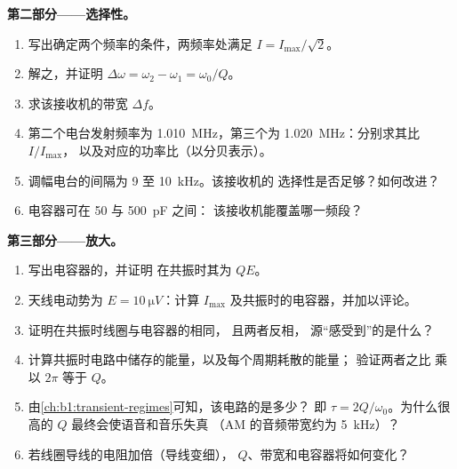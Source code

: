 \begin{problem}
\medskip
\noindent\textbf{第二部分——选择性。}
\begin{enumerate}[resume]
  \item 写出确定两个频率的条件，两频率处满足
        $I = I_{\max}/\sqrt2$。
  \item 解之，并证明 $\Delta\omega = \omega_2 - \omega_1 =
        \omega_0/Q$。
  \item 求该接收机的带宽 $\Delta f$。
  \item 第二个电台发射频率为 \qty{1.010}{MHz}，第三个为
        \qty{1.020}{MHz}：分别求其比 $I/I_{\max}$，
        以及对应的功率比（以分贝表示）。
  \item 调幅电台的间隔为 \qty{9}{} 至 \qty{10}{kHz}。该接收机的
        选择性是否足够？如何改进？
  \item 电容器可在 \qty{50}{} 与 \qty{500}{pF} 之间：
        该接收机能覆盖哪一频段？
\end{enumerate}

\medskip
\noindent\textbf{第三部分——放大。}
\begin{enumerate}[resume]
  \item 写出电容器的，并证明
        在共振时其为 $QE$。
  \item 天线电动势为 $E = \qty{10}{\micro V}$：计算 $I_{\max}$
        及共振时的电容器，并加以评论。
  \item 证明在共振时线圈与电容器的相同，
        且两者反相，
        源“感受到”的是什么？
  \item 计算共振时电路中储存的能量，以及每个周期耗散的能量；
        验证两者之比
        乘以 $2\pi$ 等于 $Q$。
  \item 由\cref{ch:b1:transient-regimes}可知，该电路的是多少？
        即 $\tau = 2Q/\omega_0$。为什么很高的 $Q$ 最终会使语音和音乐失真
        （AM 的音频带宽约为
        \qty{5}{kHz}）？
  \item 若线圈导线的电阻加倍（导线变细），
        $Q$、带宽和电容器将如何变化？
\end{enumerate}


\end{problem}

